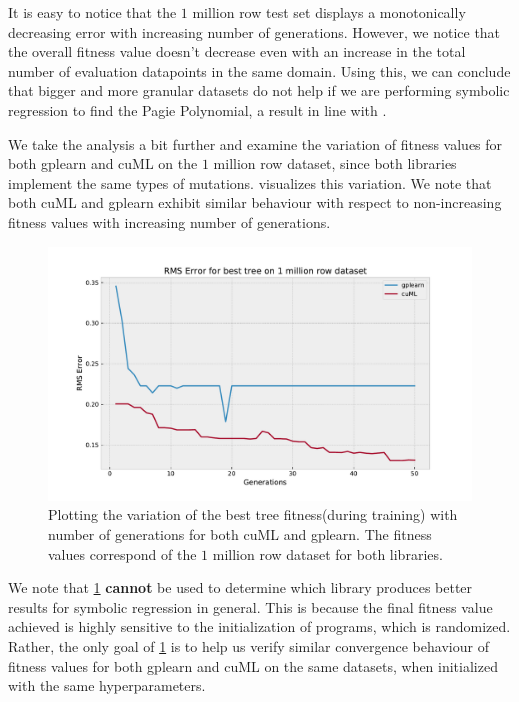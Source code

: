 It is easy to notice that the $1$ million row test set displays a monotonically decreasing error with increasing number of generations. However, we notice that the overall fitness value doesn't decrease even with an increase in the total number of evaluation datapoints in the same domain. Using this, we can conclude that bigger and more granular datasets do not help if we are performing symbolic regression to find the Pagie Polynomial, a result in line with \citep{baeta2021speed}.

We take the analysis a bit further and examine the variation of fitness values for both gplearn and cuML on the $1$ million row dataset, since both libraries implement the same types of mutations.  visualizes this variation. We note that both cuML and gplearn exhibit similar behaviour with respect to non-increasing fitness values with increasing number of generations. 

\begin{figure}[h]
  \centering
  \includegraphics[scale=0.59]{images/RMSErrorGPLEARN.pdf}
  \caption{Plotting the variation of the best tree fitness(during training) with number of generations for both cuML and gplearn. The fitness values correspond of the $1$ million row dataset for both libraries.}
  \label{fig:gplearnvscuML1mil}
\end{figure}

We note that \cref{fig:gplearnvscuML1mil} \textbf{cannot} be used to determine which library produces better results for symbolic regression in general. This is because the final fitness value achieved is highly sensitive to the initialization of programs, which is randomized. Rather, the only goal of \cref*{fig:gplearnvscuML1mil} is to help us verify similar convergence behaviour of fitness values for both gplearn and cuML on the same datasets, when initialized with the same hyperparameters.

